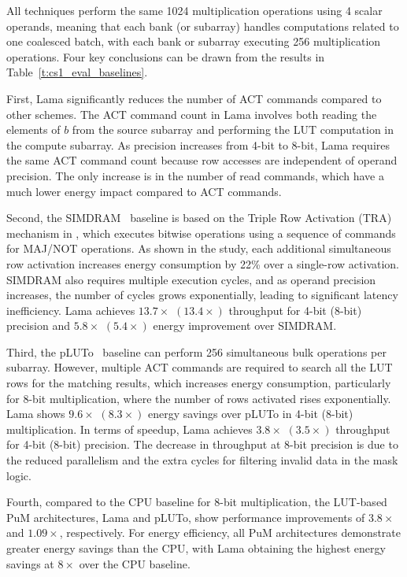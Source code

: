 All techniques perform the same 1024 multiplication operations using 4 scalar operands, meaning that each bank (or subarray) handles computations related to one coalesced batch, with each bank or subarray executing 256 multiplication operations. Four key conclusions can be drawn from the results in Table~\ref{t:cs1_eval_baselines}.

First, Lama significantly reduces the number of ACT commands compared to other schemes. The ACT command count in Lama involves both reading the elements of $b$ from the source subarray and performing the LUT computation in the compute subarray. As precision increases from 4-bit to 8-bit, Lama requires the same ACT command count because row accesses are independent of operand precision. The only increase is in the number of read commands, which have a much lower energy impact compared to ACT commands.

Second, the SIMDRAM~\cite{simdram} baseline is based on the Triple Row Activation (TRA) mechanism in \cite{ambit}, which executes bitwise operations using a sequence of commands for MAJ/NOT operations. As shown in the study, each additional simultaneous row activation increases energy consumption by 22\% over a single-row activation. SIMDRAM also requires multiple execution cycles, and as operand precision increases, the number of cycles grows exponentially, leading to significant latency inefficiency. Lama achieves $13.7\times$ $(13.4\times)$ throughput for 4-bit (8-bit) precision and $5.8\times$ $(5.4\times)$ energy improvement over SIMDRAM.

Third, the pLUTo~\cite{pluto} baseline can perform 256 simultaneous bulk operations per subarray. However, multiple ACT commands are required to search all the LUT rows for the matching results, which increases energy consumption, particularly for 8-bit multiplication, where the number of rows activated rises exponentially. Lama shows $9.6\times$ $(8.3\times)$ energy savings over pLUTo in 4-bit (8-bit) multiplication. In terms of speedup, Lama achieves $3.8\times$ $(3.5\times)$ throughput for 4-bit (8-bit) precision. The decrease in throughput at 8-bit precision is due to the reduced parallelism and the extra cycles for filtering invalid data in the mask logic.

Fourth, compared to the CPU baseline for 8-bit multiplication, the LUT-based PuM architectures, Lama and pLUTo, show performance improvements of $3.8\times$ and $1.09\times$, respectively. For energy efficiency, all PuM architectures demonstrate greater energy savings than the CPU, with Lama obtaining the highest energy savings at $8\times$ over the CPU baseline.

